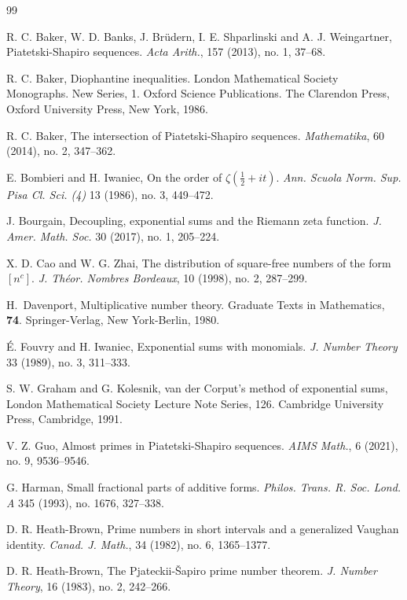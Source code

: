 \documentclass[12pt, reqno, twoside, letterpaper]{amsart}
\numberwithin{equation}{section}
\theoremstyle{customthm}
\theoremstyle{customrem}
\begin{document}
\begin{thebibliography}{99}


R. C. Baker, W. D. Banks, J. Br\"{u}dern, I. E. Shparlinski and A. J. Weingartner,
Piatetski-Shapiro sequences.
\emph{Acta Arith.}, 157 (2013), no. 1, 37--68.

R. C. Baker,
Diophantine inequalities. London Mathematical Society Monographs. New Series, 1. Oxford Science Publications. The Clarendon Press, Oxford University Press, New York, 1986.
	
R. C. Baker,
The intersection of Piatetski-Shapiro sequences.
\emph{Mathematika},
60 (2014), no. 2, 347--362.

E. Bombieri and H. Iwaniec,
On the order of $\zeta(\frac{1}{2} + it)$.
\emph{Ann. Scuola Norm. Sup. Pisa Cl. Sci. (4)} 13 (1986), no. 3, 449--472.

J. Bourgain,
Decoupling, exponential sums and the Riemann zeta function.
\emph{J. Amer. Math. Soc.} 30 (2017), no. 1, 205--224.

X. D. Cao and W. G. Zhai,
The distribution of square-free numbers of the form $[n^c]$.
\emph{J. Th\'{e}or. Nombres Bordeaux},
10 (1998), no. 2, 287--299.

H.~Davenport,
Multiplicative number theory.
Graduate Texts in Mathematics, \textbf{74}. Springer-Verlag, New York-Berlin, 1980.

\'{E}. Fouvry and H. Iwaniec, 
Exponential sums with monomials.
\emph{J. Number Theory} 33 (1989), no. 3, 311--333.

S. W. Graham and G. Kolesnik,
van der Corput's method of exponential sums,
London Mathematical Society Lecture Note Series, 126. Cambridge University Press, Cambridge, 1991.

V. Z. Guo,
Almost primes in Piatetski-Shapiro sequences.
\emph{AIMS Math.}, 6 (2021), no. 9, 9536--9546.

G. Harman,
Small fractional parts of additive forms.
\emph{Philos. Trans. R. Soc. Lond. A} 345 (1993), no. 1676, 327--338.

D. R. Heath-Brown,
Prime numbers in short intervals and a generalized Vaughan identity.
\emph{Canad. J. Math.}, 34 (1982), no. 6, 1365--1377.

D. R. Heath-Brown,
The Pjateckii-\v{S}apiro prime number theorem.
\emph{J. Number Theory}, 16 (1983), no. 2, 242--266.


\end{thebibliography}
\end{document}
